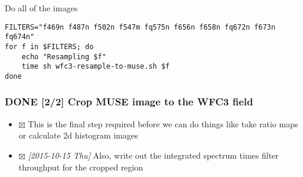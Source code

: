 \documentclass[11pt]{article}
\begin{document}
Do all of the images
\begin{verbatim}
FILTERS="f469n f487n f502n f547m fq575n f656n f658n fq672n f673n fq674n"
for f in $FILTERS; do
    echo "Resampling $f"
    time sh wfc3-resample-to-muse.sh $f
done
\end{verbatim}
\subsubsection{{\bfseries\sffamily DONE} [2/2] Crop MUSE image to the WFC3 field}
\label{sec:orgheadline37}
\begin{itemize}
\item $\boxtimes$ This is the final step required before we can do things like take ratio maps or calculate 2d histogram images
\item $\boxtimes$ \textit{[2015-10-15 Thu] } Also, write out the integrated spectrum times filter throughput for the cropped region
\end{itemize}
\end{document}
